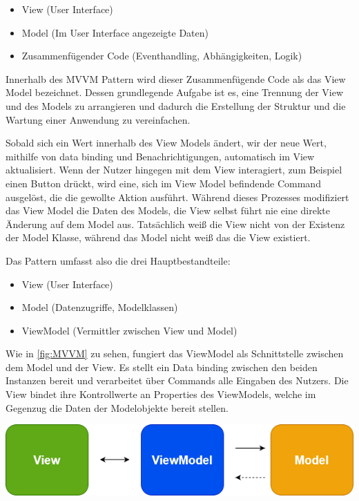 \begin{itemize}
 	\item View (User Interface)
 	\item Model (Im User Interface angezeigte Daten)
	\item Zusammenfügender Code (Eventhandling, Abhängigkeiten, Logik)
\end{itemize}

Innerhalb des MVVM Pattern wird dieser Zusammenfügende Code als das View Model bezeichnet.
Dessen grundlegende Aufgabe ist es, eine Trennung der View und des Models zu arrangieren und dadurch die Erstellung der Struktur  und die Wartung einer Anwendung zu vereinfachen.

Sobald sich ein Wert innerhalb des View Models ändert, wir der neue Wert, mithilfe von data binding und Benachrichtigungen, automatisch im View aktualisiert.
Wenn der Nutzer hingegen mit dem View interagiert, zum Beispiel einen Button drückt, wird eine, sich im View Model befindende Command ausgelöst, die die gewollte Aktion ausführt.
Während dieses Prozesses modifiziert das View Model die Daten des Models, die View selbst führt nie eine direkte Änderung auf dem Model aus.
Tatsächlich weiß die View nicht von der Existenz der Model Klasse, während das Model nicht weiß das die View existiert.

Das Pattern umfasst also die drei Hauptbestandteile:
\begin{itemize}
 	\item View (User Interface)
 	\item Model (Datenzugriffe, Modelklassen)
	\item ViewModel (Vermittler zwischen View und Model)
\end{itemize}

Wie in \cref{fig:MVVM} zu sehen, fungiert das ViewModel als Schnittstelle zwischen dem Model und der View. Es stellt ein Data binding zwischen den beiden Instanzen bereit und verarbeitet über Commands alle Eingaben des Nutzers.
Die View bindet ihre Kontrollwerte an Properties des ViewModels, welche im Gegenzug die Daten der Modelobjekte bereit stellen.

\begin{center}
  \includegraphics[scale=0.6]{figures/MVVM.PNG}
  \label{fig:MVVM}
\end{center}

